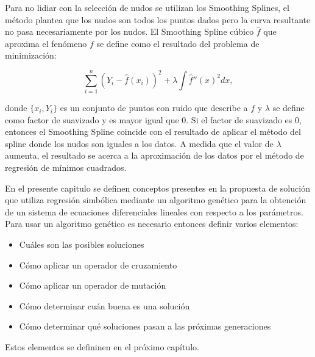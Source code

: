Para no lidiar con la selección de nudos se utilizan los Smoothing Splines, el método plantea que los nudos son todos los puntos dados pero la curva resultante no pasa necesariamente por los nudos. El Smoothing Spline cúbico $\hat{f}$ que aproxima el fenómeno $f$ se define como el resultado del problema de minimización:

$$\sum_{i=1}^n (Y_i - \hat{f}(x_i))^2 + \lambda \int \hat{f}''(x)^2 dx,$$

donde $\{x_i, Y_i\}$ es un conjunto de puntos con ruido que describe a $f$ y $\lambda$ se define como factor de suavizado y es mayor igual que 0. Si el factor de suavizado es 0, entonces el Smoothing Spline coincide con el resultado de aplicar el método del spline donde los nudos son iguales a los datos. A medida que el valor de $\lambda$ aumenta, el resultado se acerca a la aproximación de los datos por el método de regresión de mínimos cuadrados. \cite{green1993nonparametric}


En el presente capitulo se definen conceptos presentes en la propuesta de solución que utiliza regresión simbólica mediante un algoritmo genético para la obtención de un sistema de ecuaciones diferenciales lineales con respecto a los parámetros. Para usar un algoritmo genético es necesario entonces definir varios elementos:

\begin{itemize}
    \item Cuáles son las posibles soluciones
    \item Cómo aplicar un operador de cruzamiento
    \item Cómo aplicar un operador de mutación
    \item Cómo determinar cuán buena es una solución
    \item Cómo determinar qué soluciones pasan a las próximas generaciones
\end{itemize}

Estos elementos se defininen en el próximo capítulo.
